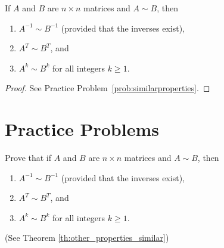 \documentclass{ximera}
\begin{document}
\begin{theorem}\label{th:other_properties_similar}
If $A$ and $B$ are $n\times n$ matrices and $A\sim B$, then
\begin{enumerate}
\item\label{th:properties_similar_inverse} $A^{-1} \sim B^{-1}$ (provided that the inverses exist),
\item\label{th:properties_similar_transpose} $A^T \sim B^T$, and
\item\label{th:properties_similar_powers} $A^k \sim B^k$ for all integers $k \geq 1$.
\end{enumerate}
\end{theorem}

\begin{proof}
See Practice Problem~\ref{prob:similarproperties}.
\end{proof}

\section*{Practice Problems}

\begin{problem}\label{prob:similarproperties}
Prove that if $A$ and $B$ are $n\times n$ matrices and $A\sim B$, then
\begin{enumerate}
\item\label{th:properties_similar_inverse} $A^{-1} \sim B^{-1}$ (provided that the inverses exist),
\item\label{th:properties_similar_transpose} $A^T \sim B^T$, and
\item\label{th:properties_similar_powers} $A^k \sim B^k$ for all integers $k \geq 1$.
\end{enumerate} 
(See Theorem \ref{th:other_properties_similar})
\end{problem}
\end{document}
